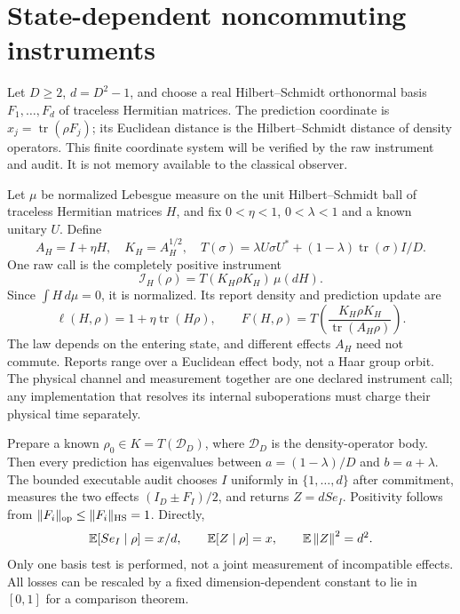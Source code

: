 \section{State-dependent noncommuting instruments}\label{sec:quantum}
Let $D\ge2$, $d=D^2-1$, and choose a real Hilbert--Schmidt orthonormal basis $F_1,\ldots,F_d$ of traceless Hermitian matrices. The prediction coordinate is $x_j=\operatorname{tr}(\rho F_j)$; its Euclidean distance is the Hilbert--Schmidt distance of density operators. This finite coordinate system will be verified by the raw instrument and audit. It is not memory available to the classical observer.

Let $\mu$ be normalized Lebesgue measure on the unit Hilbert--Schmidt ball of traceless Hermitian matrices $H$, and fix $0<\eta<1$, $0<\lambda<1$ and a known unitary $U$. Define
\[
 A_H=I+\eta H,\quad K_H=A_H^{1/2},\quad
 T(\sigma)=\lambda U\sigma U^*+(1-\lambda)\operatorname{tr}(\sigma)I/D.
\]
One raw call is the completely positive instrument
\begin{equation}\label{eq:quantum-raw}
 \mathcal I_H(\rho)=T(K_H\rho K_H)\,\mu(dH).
\end{equation}
Since $\int H\,d\mu=0$, it is normalized. Its report density and prediction update are
\[
 \ell(H,\rho)=1+\eta\operatorname{tr}(H\rho),\qquad
 F(H,\rho)=T\left(\frac{K_H\rho K_H}{\operatorname{tr}(A_H\rho)}\right).
\]
The law depends on the entering state, and different effects $A_H$ need not commute. Reports range over a Euclidean effect body, not a Haar group orbit. The physical channel and measurement together are one declared instrument call; any implementation that resolves its internal suboperations must charge their physical time separately.

Prepare a known $\rho_0\in K=T(\mathcal D_D)$, where $\mathcal D_D$ is the density-operator body. Then every prediction has eigenvalues between $a=(1-\lambda)/D$ and $b=a+\lambda$. The bounded executable audit chooses $I$ uniformly in $\{1,\ldots,d\}$ after commitment, measures the two effects $(I_D\pm F_I)/2$, and returns $Z=dS e_I$. Positivity follows from $\|F_i\|_{\rm op}\le\|F_i\|_{\rm HS}=1$. Directly,
\begin{equation}\label{eq:audit-normalization}
 \mathbb E[S e_I\mid\rho]=x/d,\qquad \mathbb E[Z\mid\rho]=x,
 \qquad \mathbb E\left\lVert Z\right\rVert^2=d^2.
\end{equation}
Only one basis test is performed, not a joint measurement of incompatible effects. All losses can be rescaled by a fixed dimension-dependent constant to lie in $[0,1]$ for a comparison theorem.

